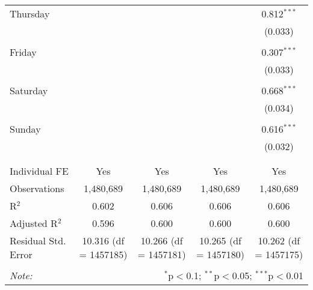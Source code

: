 \documentclass[
]{article}
\begin{document}
\begin{table}[!htbp]
{\begin{tabular}{@{\extracolsep{5pt}}lcccc}
 Thursday &  &  &  & 0.812$^{***}$ \\ 
  &  &  &  & (0.033) \\ 
  & & & & \\ 
 Friday &  &  &  & 0.307$^{***}$ \\ 
  &  &  &  & (0.033) \\ 
  & & & & \\ 
 Saturday &  &  &  & 0.668$^{***}$ \\ 
  &  &  &  & (0.034) \\ 
  & & & & \\ 
 Sunday &  &  &  & 0.616$^{***}$ \\ 
  &  &  &  & (0.032) \\ 
  & & & & \\ 
\hline \\[-1.8ex] 
Individual FE & Yes & Yes & Yes & Yes \\ 
Observations & 1,480,689 & 1,480,689 & 1,480,689 & 1,480,689 \\ 
R$^{2}$ & 0.602 & 0.606 & 0.606 & 0.606 \\ 
Adjusted R$^{2}$ & 0.596 & 0.600 & 0.600 & 0.600 \\ 
Residual Std. Error & 10.316 (df = 1457185) & 10.266 (df = 1457181) & 10.265 (df = 1457180) & 10.262 (df = 1457175) \\ 
\hline 
\hline \\[-1.8ex] 
\textit{Note:}  & \multicolumn{4}{r}{$^{*}$p$<$0.1; $^{**}$p$<$0.05; $^{***}$p$<$0.01} \\ 
\end{tabular}
} 
\end{table} 
\newpage
\end{document}
